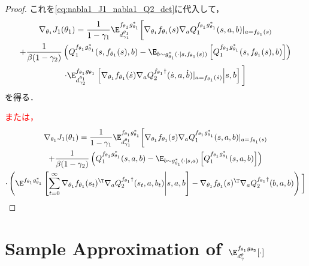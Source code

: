 \documentclass[a4paper,10pt,dvipdfmx]{jsarticle}
\begin{document}
\begin{proof}
これを\cref{eq:nabla1_J1_nabla1_Q2_det}に代入して，
\begin{multline}
    \nabla_{\theta_1}J_1(\theta_1)
    =\dfrac{1}{1-\gamma_1}\E_{d_{\gamma_1}^{\theta_1}}^{f_{\theta_1}g_{\theta_1}^*}\bigg[\nabla_{\theta_1}f_{\theta_1}(s)\nabla_{a}Q_1^{f_{\theta_1}g_{\theta_1}^*}(s,a,b)|_{a=f_{\theta_1}(s)}\\
    +\dfrac{1}{\beta(1-\gamma_2)}\left(Q_1^{f_{\theta_1}g_{\theta_1}^*}(s,f_{\theta_1}(s),b)-\E_{b\sim g_{\theta_1}^*(\cdot|s,f_{\theta_1}(s))}\left[Q_1^{f_{\theta_1}g_{\theta_1}^*}(s,f_{\theta_1}(s),b)\right]\right)\\
    \cdot\E_{d_{\gamma_2}^{\theta_1}}^{f_{\theta_1}g_{\theta_1}}\left[\nabla_{\theta_1}f_{\theta_1}(\dot{s})\nabla_{a}Q_2^{f_{\theta_1}\dag}(\dot{s},a,\dot{b})|_{a=f_{\theta_1}(\dot{s})}\middle|s,b\right]\bigg]
\end{multline}
を得る．

\textcolor{red}{または，
\begin{multline}
    \nabla_{\theta_1}J_1(\theta_1)
    =\dfrac{1}{1-\gamma_1}\E_{d_{\gamma_1}^{\theta_1}}^{f_{\theta_1}g_{\theta_1}^*}\bigg[\nabla_{\theta_1}f_{\theta_1}(s)\nabla_{a}Q_1^{f_{\theta_1}g_{\theta_1}^*}(s,a,b)|_{a=f_{\theta_1}(s)}\\
    +\dfrac{1}{\beta(1-\gamma_2)}\left(Q_1^{f_{\theta_1}g_{\theta_1}^*}(s,a,b)-\E_{b\sim g_{\theta_1}^*(\cdot|s,a)}\left[Q_1^{f_{\theta_1}g_{\theta_1}^*}(s,a,b)\right]\right)\\
    \cdot\left(\E^{f_{\theta_1}g_{\theta_1}^*}\left[\sum_{t=0}^\infty\nabla_{\theta_1}f_{\theta_1}(s_t)^{\T}\nabla_aQ_2^{f_{\theta_1}\dag}(s_t,a,b_t)\middle|s,a,b\right]-\nabla_{\theta_1}f_{\theta_1}(s)^{\T}\nabla_aQ_2^{f_{\theta_1}\dag}(b,a,b)\right)\bigg]
\end{multline}
}
\end{proof}


\section{Sample Approximation of $\E_{d_{\gamma}^{\theta}}^{f_{\theta_1}g_{\theta_2}}[\cdot]$}\label{sec:sample_approx}
\end{document}
